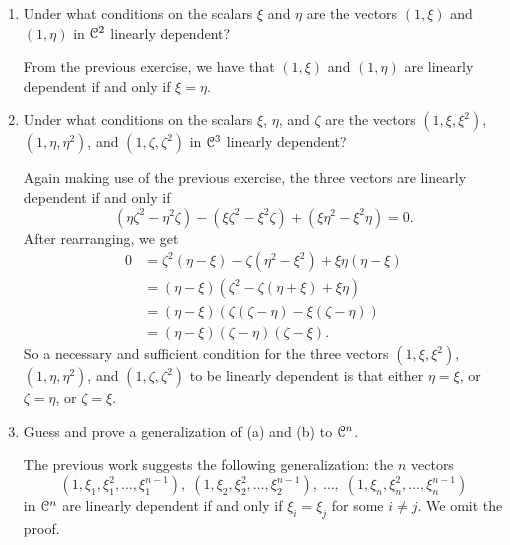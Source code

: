 \begin{enumerate}
\item Under what conditions on the scalars $\xi$ and $\eta$ are the
  vectors $(1,\xi)$ and $(1,\eta)$ in $\mathcal{C}^2$ linearly dependent?
  \begin{solution}
    From the previous exercise, we have that $(1,\xi)$ and $(1,\eta)$
    are linearly dependent if and only if $\xi = \eta$.
  \end{solution}
\item Under what conditions on the scalars $\xi$, $\eta$, and $\zeta$
  are the vectors $(1,\xi,\xi^2)$, $(1,\eta,\eta^2)$, and
  $(1,\zeta,\zeta^2)$ in $\mathcal{C}^3$ linearly dependent?
  \begin{solution}
    Again making use of the previous exercise, the three vectors are
    linearly dependent if and only if
    \begin{equation*}
      (\eta\zeta^2 - \eta^2\zeta)
      - (\xi\zeta^2 - \xi^2\zeta)
      + (\xi\eta^2 - \xi^2\eta) = 0.
    \end{equation*}
    After rearranging, we get
    \begin{align*}
      0 &= \zeta^2(\eta - \xi) - \zeta(\eta^2 - \xi^2)
          + \xi\eta(\eta - \xi) \\
        &= (\eta - \xi)(\zeta^2 - \zeta(\eta + \xi) + \xi\eta) \\
        &= (\eta - \xi)(\zeta(\zeta - \eta) - \xi(\zeta - \eta)) \\
        &= (\eta - \xi)(\zeta - \eta)(\zeta - \xi).
    \end{align*}
    So a necessary and sufficient condition for the three vectors
    $(1,\xi,\xi^2)$, $(1,\eta,\eta^2)$, and $(1,\zeta,\zeta^2)$ to be
    linearly dependent is that either $\eta = \xi$, or $\zeta = \eta$,
    or $\zeta = \xi$.
  \end{solution}
\item Guess and prove a generalization of (a) and (b) to $\mathcal{C}^n$.
  \begin{solution}
    The previous work suggests the following generalization: the $n$ vectors
    \begin{equation*}
      (1,\xi_1,\xi_1^2,\dots,\xi_1^{n-1}),\;
      (1,\xi_2,\xi_2^2,\dots,\xi_2^{n-1}),\;
      \dots,\;
      (1,\xi_n,\xi_n^2,\dots,\xi_n^{n-1})
    \end{equation*}
    in $\mathcal{C}^n$ are linearly dependent if and only if $\xi_i = \xi_j$
    for some $i\neq j$. We omit the proof.
  \end{solution}
\end{enumerate}
